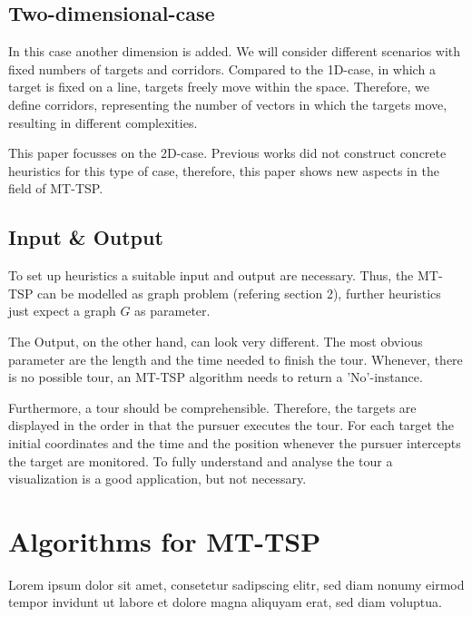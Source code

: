 \documentclass{acm_proc_article-sp}
\begin{document}

\subsection{Two-dimensional-case}

In this case another dimension is added. We will consider different scenarios with fixed numbers of targets and corridors. Compared to the 1D-case, in which a target is fixed on a line, targets freely move within the space. Therefore, we define corridors, representing the number of vectors in which the targets move, resulting in different complexities.

This paper focusses on the 2D-case. Previous works did not construct concrete heuristics for this type of case, therefore, this paper shows new aspects in the field of MT-TSP.

\subsection{Input \& Output}
To set up heuristics a suitable input and output are necessary. Thus, the MT-TSP can be modelled as graph problem (refering section 2), further heuristics just expect a graph $G$ as parameter. 

The Output, on the other hand, can look very different. The most obvious parameter are the length and the time needed to finish the tour. Whenever, there is no possible tour, an MT-TSP algorithm needs to return a 'No'-instance. 

Furthermore, a tour should be comprehensible. Therefore, the targets are displayed in the order in that the pursuer executes the tour. For each target the initial coordinates and the time and the position whenever the pursuer intercepts the target are monitored. To fully understand and analyse the tour a visualization is a good application, but not necessary. 

\section{Algorithms for MT-TSP}
Lorem ipsum dolor sit amet, consetetur sadipscing elitr, sed diam nonumy eirmod tempor invidunt ut labore et dolore magna aliquyam erat, sed diam voluptua.
\end{document}
